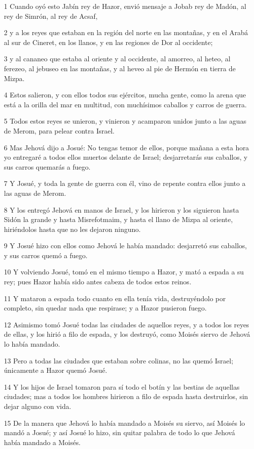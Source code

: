 \par 1 Cuando oyó esto Jabín rey de Hazor, envió mensaje a Jobab rey de Madón, al rey de Simrón, al rey de Acsaf,
\par 2 y a los reyes que estaban en la región del norte en las montañas, y en el Arabá al sur de Cineret, en los llanos, y en las regiones de Dor al occidente;
\par 3 y al cananeo que estaba al oriente y al occidente, al amorreo, al heteo, al ferezeo, al jebuseo en las montañas, y al heveo al pie de Hermón en tierra de Mizpa.
\par 4 Estos salieron, y con ellos todos sus ejércitos, mucha gente, como la arena que está a la orilla del mar en multitud, con muchísimos caballos y carros de guerra.
\par 5 Todos estos reyes se unieron, y vinieron y acamparon unidos junto a las aguas de Merom, para pelear contra Israel.
\par 6 Mas Jehová dijo a Josué: No tengas temor de ellos, porque mañana a esta hora yo entregaré a todos ellos muertos delante de Israel; desjarretarás sus caballos, y sus carros quemarás a fuego.
\par 7 Y Josué, y toda la gente de guerra con él, vino de repente contra ellos junto a las aguas de Merom.
\par 8 Y los entregó Jehová en manos de Israel, y los hirieron y los siguieron hasta Sidón la grande y hasta Misrefotmaim, y hasta el llano de Mizpa al oriente, hiriéndolos hasta que no les dejaron ninguno.
\par 9 Y Josué hizo con ellos como Jehová le había mandado: desjarretó sus caballos, y sus carros quemó a fuego.
\par 10 Y volviendo Josué, tomó en el mismo tiempo a Hazor, y mató a espada a su rey; pues Hazor había sido antes cabeza de todos estos reinos.
\par 11 Y mataron a espada todo cuanto en ella tenía vida, destruyéndolo por completo, sin quedar nada que respirase; y a Hazor pusieron fuego.
\par 12 Asimismo tomó Josué todas las ciudades de aquellos reyes, y a todos los reyes de ellas, y los hirió a filo de espada, y los destruyó, como Moisés siervo de Jehová lo había mandado.
\par 13 Pero a todas las ciudades que estaban sobre colinas, no las quemó Israel; únicamente a Hazor quemó Josué.
\par 14 Y los hijos de Israel tomaron para sí todo el botín y las bestias de aquellas ciudades; mas a todos los hombres hirieron a filo de espada hasta destruirlos, sin dejar alguno con vida.
\par 15 De la manera que Jehová lo había mandado a Moisés su siervo, así Moisés lo mandó a Josué; y así Josué lo hizo, sin quitar palabra de todo lo que Jehová había mandado a Moisés.

